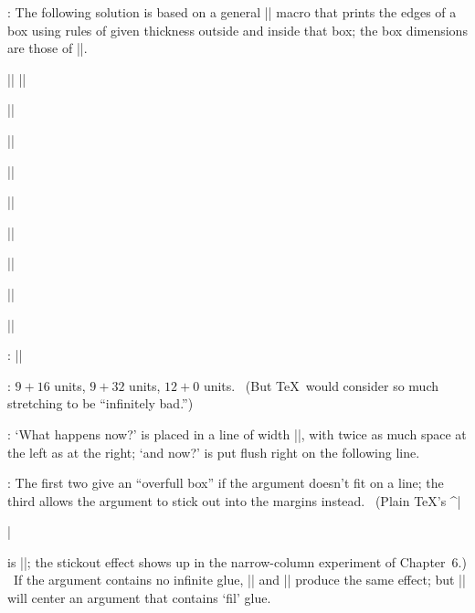 {{{:
 The following solution is based on a general |\makeblankbox|
macro that prints the edges of a box using rules of given thickness
outside and inside that box; the box dimensions are those of\/ ||.\par
|\def\dolist{\afterassignment\dodolist\let\next= }|\parbreak
|\def\dodolist{\ifx\next\endlist \let\next\relax|\parbreak
|  \else \\\let\next\dolist \fi|\parbreak
|  \next}|\par
|\def\endlist{\endlist}|\par
|\def\hidehrule#1#2{\kern-#1%
|  \hrule height#1 depth#2 \kern-#2 }|\par
|\def\hidevrule#1#2{\kern-#1{\dimen0=#1|\parbreak
|    \advance\dimen0 by#2\vrule width\dimen0}\kern-#2 }|\par
|\def\makeblankbox#1#2{\hbox{\lower\dp0\vbox{\hidehrule{#1}{#2}%
|    \kern-#1 %
|    \hbox to \wd0{\hidevrule{#1}{#2}%
|      \raise\ht0\vbox to #1{}%
|      \lower\dp0\vtop to #1{}%
|      \hfil\hidevrule{#2}{#1}}%
|    \kern-#1\hidehrule{#2}{#1}}}}|\par
|\def\maketypebox{\makeblankbox{0pt}{1pt}}|\par
|\def\makelightbox{\makeblankbox{.2pt}{.2pt}}|\par
|\def\\{\if\space\next\ %
| \else \setbox0=\hbox{\next}\maketypebox\fi}|\par
|\def\demobox#1{\setbox0=\hbox{\dolist#1\endlist}%
|  \leavevmode\copy0\kern-\wd0\makelightbox}|\par

:
 |\def\frac#1/#2{\leavevmode\kern.1em|\parbreak
|\raise.5ex\hbox{\the\scriptfont0 #1}\kern-.1em|\parbreak
|/\kern-.15em\lower.25ex\hbox{\the\scriptfont0 #2}}|

:
 $9+16$ units, $9+32$ units, $12+0$ units. \ (But \TeX\ would
consider so much stretching to be ``infinitely bad.'')

:
 `What happens now?' is placed in a line of width |\hsize|, with
twice as much space at the left as at the right; `and now?' is put flush right
on the following line.

:
 The first two give an ``overfull box'' if the argument doesn't fit
on a line; the third allows the argument to stick out into the margins
instead. \ (Plain \TeX's ^|\centerline| is |\centerlinec|; the stickout effect
shows up in the narrow-column experiment of Chapter~6.) \ If the argument
contains no infinite glue, |\centerlinea| and |\centerlineb| produce the same
effect; but |\centerlineb| will center an argument that contains `fil' glue.

}}}
